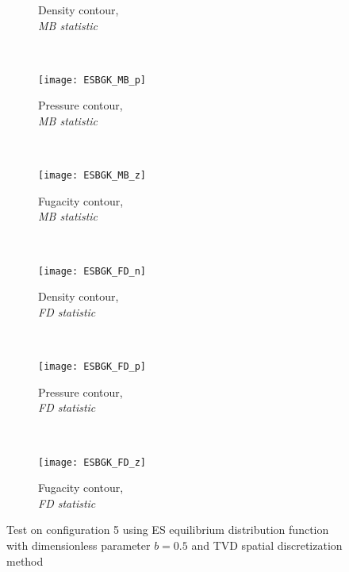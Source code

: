 \documentclass{rsproca}%
\begin{document}
\begin{figure}
\begin{subfigure}[b]{0.32\textwidth}
                \caption{Density contour, \\ \it{MB statistic}}
                \label{fig:5ESBGK_MB_n}
        \end{subfigure}
        ~ %
        \begin{subfigure}[b]{0.32\textwidth}
                \centering
                \texttt{[image: ESBGK\_MB\_p]}
                \caption{Pressure contour, \\ \it{MB statistic}}
                \label{fig:5ESBGK_MB_p}
        \end{subfigure}
				~ %
        \begin{subfigure}[b]{0.32\textwidth}
                \centering
                \texttt{[image: ESBGK\_MB\_z]}
                \caption{Fugacity contour, \\ \it{MB statistic}}
                \label{fig:5ESBGK_MB_z}
        \end{subfigure}
        ~ %
        \begin{subfigure}[b]{0.32\textwidth}
                \centering
                \texttt{[image: ESBGK\_FD\_n]}
                \caption{Density contour, \\ \it{FD statistic}}
                \label{fig:5ESBGK_FD_n}
        \end{subfigure}
        ~ %
        \begin{subfigure}[b]{0.32\textwidth}
                \centering
                \texttt{[image: ESBGK\_FD\_p]}
                \caption{Pressure contour, \\ \it{FD statistic}}
                \label{fig:5ESBGK_FD_p}
        \end{subfigure}
				~ %
        \begin{subfigure}[b]{0.32\textwidth}
                \centering
                \texttt{[image: ESBGK\_FD\_z]}
                \caption{Fugacity contour, \\ \it{FD statistic}}
                \label{fig:5ESBGK_FD_z}
        \end{subfigure}
				\caption{Test on configuration 5 using ES equilibrium distribution function with dimensionless parameter $b=0.5$ and TVD spatial discretization method} \label{fig:test_configuration5}
\end{figure}
\end{document}
